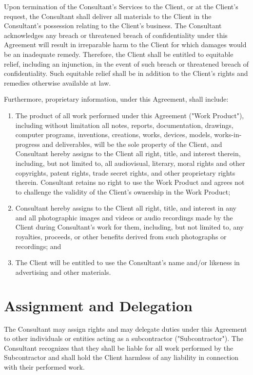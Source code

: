 \documentclass{article}
\begin{document}
Upon termination of the Consultant's Services to the Client, or at the Client's request, the Consultant shall deliver all materials to the Client in the Consultant's possession relating to the Client's business. The Consultant acknowledges any breach or threatened breach of confidentiality under this Agreement will result in irreparable harm to the Client for which damages would be an inadequate remedy. Therefore, the Client shall be entitled to equitable relief, including an injunction, in the event of such breach or threatened breach of confidentiality. Such equitable relief shall be in addition to the Client's rights and remedies otherwise available at law.

Furthermore, proprietary information, under this Agreement, shall include:

\begin{enumerate}
    \item The product of all work performed under this Agreement ("Work Product"), including without limitation all notes, reports, documentation, drawings, computer programs, inventions, creations, works, devices, models, works-in-progress and deliverables, will be the sole property of the Client, and Consultant hereby assigns to the Client all right, title, and interest therein, including, but not limited to, all audiovisual, literary, moral rights and other copyrights, patent rights, trade secret rights, and other proprietary rights therein. Consultant retains no right to use the Work Product and agrees not to challenge the validity of the Client's ownership in the Work Product;
    \item Consultant hereby assigns to the Client all right, title, and interest in any and all photographic images and videos or audio recordings made by the Client during Consultant's work for them, including, but not limited to, any royalties, proceeds, or other benefits derived from such photographs or recordings; and
    \item The Client will be entitled to use the Consultant's name and/or likeness in advertising and other materials.
\end{enumerate}

\section{Assignment and Delegation}

The Consultant may assign rights and may delegate duties under this Agreement to other individuals or entities acting as a subcontractor ("Subcontractor"). The Consultant recognizes that they shall be liable for all work performed by the Subcontractor and shall hold the Client harmless of any liability in connection with their performed work.
\end{document}
